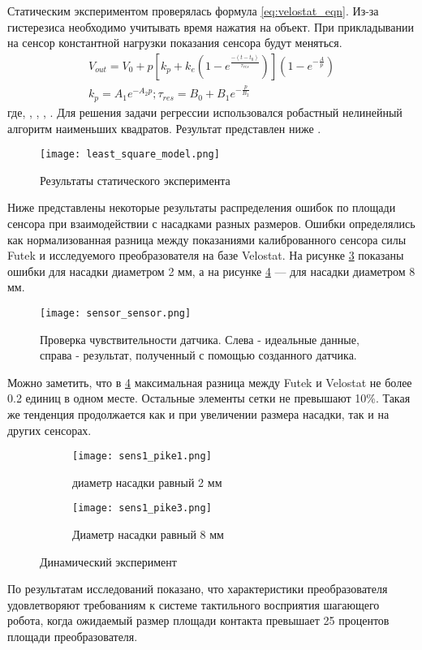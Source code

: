 Статическим экспериментом проверялась формула \eqref{eq:velostat_eqn}. Из-за гистерезиса необходимо учитывать время нажатия на объект. При прикладывании на сенсор константной нагрузки показания сенсора будут меняться.
\begin{align}
    \label{eq:velostat_eqn}
    V_{out} = V_0 + p[k_p + k_e(1-e^\frac{-(t-t_0)}{\tau_{res}})](1-e^{-\frac{A}{p}}) \\
    k_p = A_1e^{-A_2p}; \tau_{res} = B_0 + B_1e^{-\frac{p}{B_2}}
\end{align}
где,  , , , .
Для решения задачи регрессии использовался робастный нелинейный алгоритм наименьших квадратов. Результат представлен ниже .

\begin{figure}[H]
    \centering\texttt{[image: least\_square\_model.png]}
    \caption{Результаты статического эксперимента}
    \label{fig:least_square_model.png}
\end{figure}

Ниже  представлены некоторые результаты распределения ошибок по площади сенсора при взаимодействии с насадками разных размеров. Ошибки определялись как нормализованная разница между показаниями калиброванного сенсора силы Futek и исследуемого преобразователя на базе Velostat. На рисунке \ref{fig:sens1_pike1} показаны ошибки для насадки диаметром 2 мм, а на рисунке \ref{fig:sens1_pike3} — для насадки диаметром 8 мм.

\begin{figure}[H]
    \centering\texttt{[image: sensor\_sensor.png]}\\
    \caption{Проверка чувствительности датчика. Слева - идеальные данные, справа - результат, полученный с помощью созданного датчика.}
    \label{fig:sensor_sensor}
    \end{figure}

Можно заметить, что в \ref{fig:sens1_pike3} максимальная разница между Futek и Velostat не более 0.2 единиц в одном месте. Остальные элементы сетки не превышают 10\%. Такая же тенденция продолжается как и при увеличении размера насадки, так и на других сенсорах.


\begin{figure}[H]
    \begin{subfigure}{0.49\textwidth}
        \centering\texttt{[image: sens1\_pike1.png]}
        \caption{диаметр насадки равный 2 мм }
        \label{fig:sens1_pike1}
    \end{subfigure}
    \begin{subfigure}{0.49\textwidth}
        \centering\texttt{[image: sens1\_pike3.png]}
        \caption{Диаметр насадки равный 8 мм }
        \label{fig:sens1_pike3}
    \end{subfigure}
    \caption{Динамический эксперимент}
    \label{fig:dynamics_exp}
\end{figure}

По результатам исследований показано, что характеристики преобразователя удовлетворяют требованиям к системе тактильного восприятия шагающего робота, когда ожидаемый размер площади контакта превышает 25 процентов площади преобразователя.